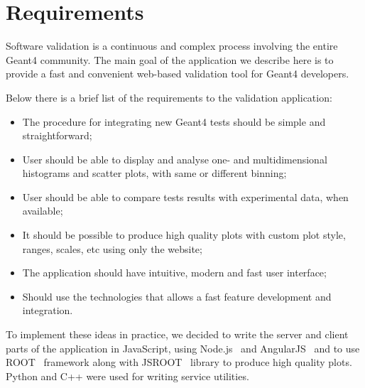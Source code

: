 \section{Requirements}
\label{sec:requirements}

Software validation is a continuous and complex process involving the entire Geant4 community. The main goal of the application we describe here is to provide a fast and convenient web-based validation tool for Geant4 developers.

Below there is a brief list of the requirements to the validation application:
\begin{itemize}
    \item The procedure for integrating new Geant4 tests should be simple and straightforward;
    \item User should be able to display and analyse one- and multidimensional histograms and scatter plots, with same or different binning;
    \item User should be able to compare tests results with experimental data, when available;
    \item It should be possible to produce high quality plots with custom plot style, ranges, scales, etc using only the website;
    \item The application should have intuitive, modern and fast user interface;
    \item Should use the technologies that allows a fast feature development and integration.
\end{itemize}

To implement these ideas in practice, we decided to write the server and client parts of the application in JavaScript, using Node.js~\cite{NodeJS} and AngularJS~\cite{AngularJS} and to use ROOT~\cite{ROOT} framework along with JSROOT~\cite{JSROOT} library to produce high quality plots. Python and C++ were used for writing service utilities.

